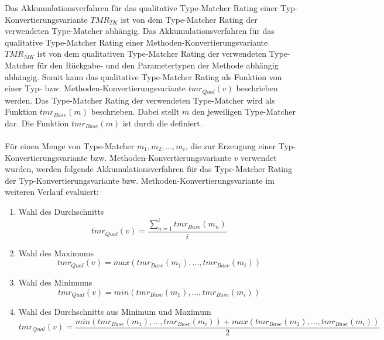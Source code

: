 Das Akkumulationsverfahren für das qualitative Type-Matcher Rating einer Typ-Konvertierungsvariante  $TMR_{TK}$ ist von dem Type-Matcher Rating der verwendeten Type-Matcher abhängig. Das Akkumulationsverfahren für das qualitative Type-Matcher Rating einer Methoden-Konvertierungsvariante  $TMR_{MK}$ ist von dem qualitativen Type-Matcher Rating der verwendeten Type-Matcher für den Rückgabe- und den Parametertypen der Methode abhängig abhängig. Somit kann das qualitative Type-Matcher Rating als Funktion von einer Typ- bzw. Methoden-Konvertierungsvariante $tmr_{Qual}(v)$ beschrieben werden.
Das Type-Matcher Rating der verwendeten Type-Matcher wird als Funktion $tmr_{Base}(m)$ beschrieben. Dabei stellt $m$ den jeweiligen Type-Matcher dar. Die Funktion $tmr_{Base}(m)$ ist durch die  definiert.\\\\
Für einen Menge von Type-Matcher $m_1, m_2, ..., m_i$, die zur Erzeugung einer Typ-Konvertierungsvariante bzw. Methoden-Konvertierungsvariante $v$ verwendet wurden, werden folgende Akkumulationsverfahren für das Type-Matcher Rating der Typ-Konvertierungsvariante bzw. Methoden-Konvertierungsvariante im weiteren Verlauf evaluiert:
\begin{enumerate}
\item Wahl des Durchschnitts
\begin{equation*}
tmr_{Qual}(v) = \frac{ \sum_{n=1}^{i} tmr_{Base}(m_n)}{i}
\end{equation*}
\item Wahl des Maximums
\begin{equation*}
tmr_{Qual}(v) = max(tmr_{Base}(m_1), ..., tmr_{Base}(m_i))
\end{equation*}
\item Wahl des Minimums
\begin{equation*}
tmr_{Qual}(v) = min(tmr_{Base}(m_1), ..., tmr_{Base}(m_i))
\end{equation*}
\item Wahl des Durchschnitts aus Minimum und Maximum
\begin{equation*}
tmr_{Qual}(v) = \frac{min(tmr_{Base}(m_1), ..., tmr_{Base}(m_i)) +  max(tmr_{Base}(m_1), ..., tmr_{Base}(m_i))}{2}
\end{equation*}

\end{enumerate}
